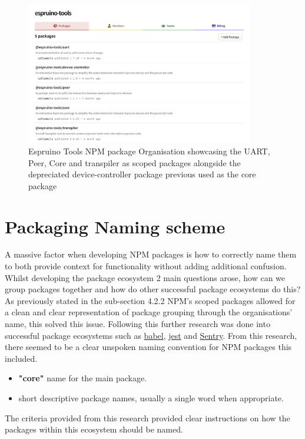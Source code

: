 \documentclass{l4proj}
\begin{document}
\begin{figure}[!ht]
    \centering
    \includegraphics[width=10cm]{dissertation/images/npm-scoped-packages.png}
    \caption{Espruino Tools NPM package Organisation showcasing the UART, Peer, Core and transpiler as scoped packages alongside the depreciated device-controller package previous used as the core package}
    \label{fig:npmorg}
\end{figure}

\section{Packaging Naming scheme}
A massive factor when developing NPM packages is how to correctly name them to both provide context for functionality without adding additional confusion. Whilst developing the package ecosystem 2 main questions arose, how can we group packages together and how do other successful package ecosystems do this? As previously stated in the sub-section 4.2.2 NPM's scoped packages allowed for a clean and clear representation of package grouping through the organisations' name, this solved this issue. Following this further research was done into successful package ecosystems such as \href{https://babeljs.io/}{babel}, \href{https://jestjs.io/}{jest} and \href{https://sentry.io/welcome/}{Sentry}. From this research, there seemed to be a clear unspoken naming convention for NPM packages this included.
\begin{itemize}
    \item \textbf{"core"} name for the main package.
    \item short descriptive package names, usually a single word when appropriate.
\end{itemize}

The criteria provided from this research provided clear instructions on how the packages within this ecosystem should be named.
\end{document}
